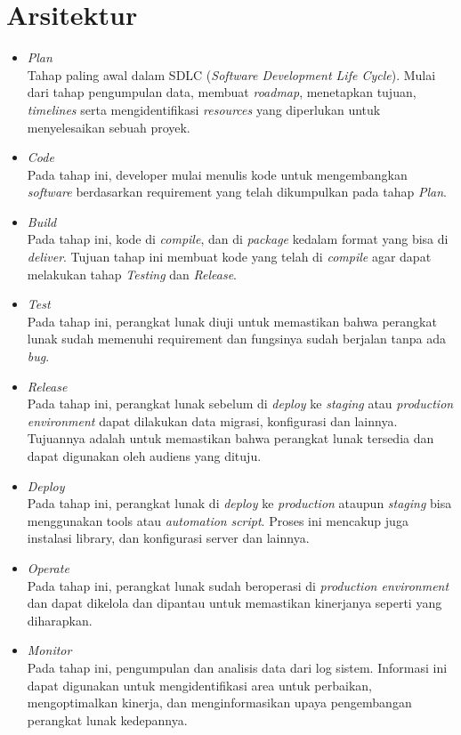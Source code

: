 \section{Arsitektur}
	\begin{itemize}
	\item \textit{Plan}
	\\Tahap paling awal dalam SDLC (\textit{Software Development Life Cycle}). Mulai dari tahap pengumpulan data, membuat \textit{roadmap}, menetapkan tujuan, \textit{timelines} serta mengidentifikasi \textit{resources} yang diperlukan untuk menyelesaikan sebuah proyek.
	\item \textit{Code}
	\\Pada tahap ini, developer mulai menulis kode untuk mengembangkan \textit{software} berdasarkan requirement yang telah dikumpulkan pada tahap \textit{Plan}.
	\item \textit{Build}
	\\Pada tahap ini, kode di \textit{compile}, dan di \textit{package} kedalam format yang bisa di \textit{deliver}. Tujuan tahap ini membuat kode yang telah di \textit{compile} agar dapat melakukan tahap \textit{Testing} dan \textit{Release}.
	\item \textit{Test}
	\\Pada tahap ini, perangkat lunak diuji untuk memastikan bahwa perangkat lunak sudah memenuhi requirement dan fungsinya sudah berjalan tanpa ada \textit{bug}.
	\item \textit{Release}
	\\Pada tahap ini, perangkat lunak sebelum di \textit{deploy} ke \textit{staging} atau \textit{production} \textit{environment} dapat dilakukan data migrasi, konfigurasi dan lainnya. Tujuannya adalah untuk memastikan bahwa perangkat lunak tersedia dan dapat digunakan oleh audiens yang dituju.
	\item \textit{Deploy}
	\\Pada tahap ini, perangkat lunak di \textit{deploy} ke \textit{production} ataupun \textit{staging} bisa menggunakan tools atau \textit{automation} \textit{script}. Proses ini mencakup juga instalasi library, dan konfigurasi server dan lainnya.
	\item \textit{Operate}
	\\Pada tahap ini, perangkat lunak sudah beroperasi di \textit{production environment} dan dapat dikelola dan dipantau untuk memastikan kinerjanya seperti yang diharapkan.
	\item \textit{Monitor}
	\\Pada tahap ini, pengumpulan dan analisis data dari log sistem. Informasi ini dapat digunakan untuk mengidentifikasi area untuk perbaikan, mengoptimalkan kinerja, dan menginformasikan upaya pengembangan perangkat lunak kedepannya.
\end{itemize}



